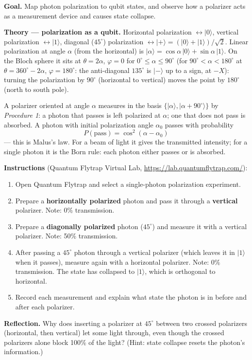 \documentclass[a4paper,11pt]{article}
\providecommand{\ket}[1]{|{#1}\rangle}
\begin{document}
\begin{studentbox}
\textbf{Goal.} Map photon polarization to qubit states, and observe how a polarizer acts
as a measurement device and causes state collapse.

\medskip
\textbf{Theory --- polarization as a qubit.} Horizontal polarization $\leftrightarrow
\ket{0}$, vertical polarization $\leftrightarrow \ket{1}$, diagonal ($45^\circ$)
polarization $\leftrightarrow \ket{+} = (\ket{0} + \ket{1})/\sqrt 2$. Linear polarization at
angle $\alpha$ (from the horizontal) is
$\ket{\alpha} = \cos\alpha\,\ket{0} + \sin\alpha\,\ket{1}$. On the Bloch sphere it sits at
$\theta = 2\alpha$, $\varphi = 0$ for $0^\circ \le \alpha \le 90^\circ$ (for $90^\circ < \alpha < 180^\circ$ at
$\theta = 360^\circ - 2\alpha$, $\varphi = 180^\circ$: the anti-diagonal $135^\circ$ is $\ket{-}$ up to a
sign, at $-X$): turning the polarization by $90^\circ$ (horizontal to
vertical) moves the point by $180^\circ$ (north to south pole).

A polarizer oriented at angle $\alpha$ measures in the basis
$\{\ket{\alpha}, \ket{\alpha + 90^\circ}\}$ by \emph{Procedure 1}: a photon that passes
is left polarized at $\alpha$; one that does not pass is absorbed. A photon with initial
polarization angle $\alpha_0$ passes with probability
\begin{equation}
    P(\text{pass}) = \cos^2(\alpha - \alpha_0)
\end{equation}
--- this is Malus's law. For a beam of light it gives the transmitted intensity; for a
single photon it is the Born rule: each photon either passes or is absorbed.

\medskip
\textbf{Instructions} (Quantum Flytrap Virtual Lab, \url{https://lab.quantumflytrap.com/}):
\begin{enumerate}
    \item Open Quantum Flytrap and select a single-photon polarization experiment.
    \item Prepare a \textbf{horizontally polarized} photon and pass it through a
          \textbf{vertical} polarizer. Note: 0\% transmission.
    \item Prepare a \textbf{diagonally polarized} photon ($45^\circ$) and measure it with a
          vertical polarizer. Note: 50\% transmission.
    \item After passing a $45^\circ$ photon through a vertical polarizer (which leaves it in
          $\ket{1}$ when it passes), measure again with a horizontal polarizer. Note: 0\%
          transmission. The state has collapsed to $\ket{1}$, which is orthogonal to
          horizontal.
    \item Record each measurement and explain what state the photon is in before and after
          each polarizer.
\end{enumerate}

\textbf{Reflection.} Why does inserting a polarizer at $45^\circ$ between two crossed
polarizers (horizontal, then vertical) let some light through, even though the crossed
polarizers alone block 100\% of the light? (Hint: state collapse resets the photon's
information.)
\end{studentbox}
\end{document}
